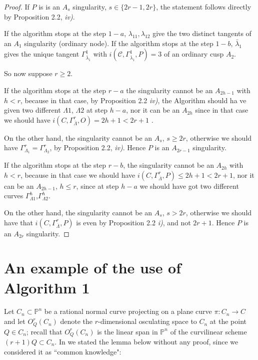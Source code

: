 \documentclass[draft]{amsart}
\theoremstyle{definition}
\theoremstyle{remark}
\theoremstyle{definition}
\newcommand{\PP}{\mathbb{P}}
\def\a{\bigskip \par \noindent}
\def\b{\par \noindent}
\def\dd{\medskip \par \noindent}
\def\l{\lambda}
\begin{document}
\begin{proof} If $P$ is  is an $A_{s}$ singularity, $s\in \{2r-1,2r\}$, the statement follows directly by Proposition 2.2, {\it iv)}. 

\dd  If the algorithm stops at the step $1-a$,  $\l_{11}, \l_{12}$ give the two distinct tangents of an $A_1$ singularity (ordinary node).  If the algorithm stops at the step $1-b$, $\bar \l_1$ gives the unique tangent $\Gamma^1_{\bar \l_1}$ with $i(\mathcal{C},\Gamma^1_{\bar \l_1},P)=3$ of an ordinary cusp $A_2$.

\dd So now suppose $r\geq 2$.

\dd If the algorithm stops at the step $r-a$ the singularity cannot be an $A_{2h-1}$ with $h< r$, because in that case, by Proposition 2.2 {\it iv)}, the Algorithm should ha ve given two different $\Lambda1$, $\Lambda2$ at step $h-a$, nor it can be an $A_{2h}$ since in that case we should have $i(C,\Gamma^r_{\bar \Lambda},O) = 2h+1<2r+1$ .

\b On the other hand, the singularity cannot be an $A_s$, $s\geq 2r$, otherwise we should have  $\Gamma^r_{\Lambda_1} =\Gamma^r_{\Lambda_2} $, by  Proposition 2.2, {\it iv)}. Hence $P$ is an $A_{2r-1}$ singularity. 

\a If the algorithm stops at the step $r-b$, the singularity cannot be an $A_{2h}$ with $h<r$, because in that case we should have $i(C, \Gamma^r_{\overline \Lambda},P)\leq 2h+1<2r+1$, nor it can be an $A_{2h-1}$, $h\leq r$, since at step $h-a$ we should have got two different curves $\Gamma^h_{\Lambda 1}$,$\Gamma^h_{\Lambda 2}$.

\b On the other hand, the singularity cannot be an $A_s$, $s > 2r$, otherwise we should have that   $i(C, \Gamma^r_{\overline \Lambda},P)$ is even by Proposition 2.2 {\it i)}, and not $2r+1$. Hence $P$ is an $A_{2r}$ singularity.


\end{proof}

\section{An example of the use of Algorithm 1}

\a Let  $C_n \subset \PP ^n$ be a rational normal curve projecting on a plane curve $\pi: C_n \to C$ and let
 $O^r_Q(C_n)$ denote the $r$-dimensional osculating space to $C_n$ at the point $Q\in C_n$; recall that $O^r_Q(C_n)$ is the linear span in $\PP^n$ of the curvilinear scheme $(r+1)Q \subset C_n$. In \cite{BGI} we stated the lemma below without any proof, since we considered it as ``common knowledge":
\end{document}
